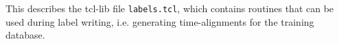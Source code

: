 
\section{}

This describes the tcl-lib  file \texttt{labels.tcl}, which contains
routines that can be used during label writing, i.e. generating
time-alignments for the training database.

\subsection{}

\subsection{}

